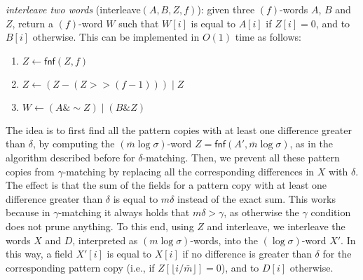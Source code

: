 \documentclass{llncs}
\newcommand{\floor}[1]{\lfloor #1 \rfloor}
\newcommand{\uand}{\mathrel{\&}}
\newcommand{\uor}{\mathrel{|}}
\newcommand{\unot}{\mathop{\sim}}
\newcommand{\word}[1]{#1}
\newcommand{\fword}[1]{$(#1)$-word}
\begin{document}
\medskip
\noindent \emph{interleave two words}
(\textsf{interleave}$(A,B,Z,f)$): given three \fword{f}s $\word{A}$,
$\word{B}$ and $\word{Z}$, return a \fword{f} $W$ such that $W[i]$ is
equal to $A[i]$ if $Z[i] = 0$, and to $B[i]$ otherwise. This can be
implemented in $O(1)$ time as follows:
\begin{enumerate}
\item $\word{Z} \leftarrow \textsf{fnf}(\word{Z}, f)$
\item $\word{Z} \leftarrow (\word{Z} - (\word{Z} >> (f-1))) \uor \word{Z}$
\item $\word{W} \leftarrow (\word{A} \uand \unot \word{Z}) \uor (\word{B} \uand \word{Z})$
\end{enumerate}
The idea is to first find all the pattern copies with at least one
difference greater than $\delta$, by computing the
\fword{\bar{m}\log\sigma} $Z = \textsf{fnf}(\word{A'},
\bar{m}\log\sigma)$, as in the algorithm described before for
$\delta$-matching. Then, we prevent all these pattern copies from
$\gamma$-matching by replacing all the corresponding differences in
$X$ with $\delta$. The effect is that the sum of the fields for a
pattern copy with at least one difference greater than $\delta$ is
equal to $m \delta$ instead of the exact sum. This works because in
$\gamma$-matching it always holds that $m \delta > \gamma$, as
otherwise the $\gamma$ condition does not prune anything. To this end,
using $Z$ and \textsf{interleave}, we interleave the words $X$ and
$D$, interpreted as \fword{m\log\sigma}s, into the \fword{\log\sigma}
$X'$. In this way, a field $X'[i]$ is equal to $X[i]$ if no difference
is greater than $\delta$ for the corresponding pattern copy (i.e., if
$Z[\floor{i / \bar{m}}] = 0$), and to $D[i]$ otherwise.
\end{document}
